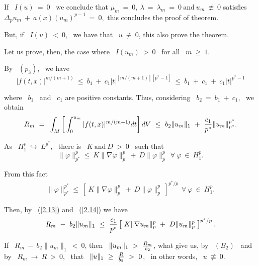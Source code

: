 \documentclass[12pt]{article}
\begin{document}
If \ $I(u) \ = \ 0$ \ we conclude that  $\mu_m \ = \ 0, \ \lambda \ = \ \lambda_m \ = \ 0 \ \mbox{and} \ u_m \ \not\equiv \ 0$ 
 satisfies 
$\Delta_pu_m \ + \ a(x)(u_m)^{p-1} \ = \ 0,$
  this concludes the proof of theorem.

But, if \ $I(u) \ < \ 0$, \ we have that \ $u \ \not\equiv \ 0$, this also prove the theorem.
{\vspace{0.2cm}}

Let us prove, then, the case where \ $I(u_m) \ > \ 0$ \ for all \ $m \ \geq \ 1$.

By \ $(p_3)$, \ we have
\vspace{-0.5mm}
$$|f(t,x)|^{m/(m+1)} \ \leq \ b_1 \ + \ c_1 |t|^{[m/(m+1)][p^{\ast}-1]} \ \leq \ b_1 \ + \ c_1 \ + \ c_1|t|^{p^{\ast}-1}$$

\noindent  where \ $b_1$ \ and \ $c_1$ are  positive constants. Thus, considering \ $b_2 \ = \ b_1 \ + \ c_1$, \ we obtain
\vspace{-0.5mm}
\begin{eqnarray}
\label{2.13}
R_m \ = \ {\displaystyle}\int_M{\left[{\displaystyle}\int_0^{u_m}{|f(t,x)|^{m/(m+1)}dt}\right]dV} \ \leq \ b_2\|u_m\|_1 \ +
 \ {\displaystyle}\frac{c_1}{p^{\ast}}\|u_m\|^{p^{\ast}}_{p^{\ast}}. 
\end{eqnarray}

As \ $H^p_1 \ \hookrightarrow \ L^{p^{\ast}}$, \ there is \ $K \ \mbox{and} \ D \ > \ 0$ \ such that 
\vspace{-0.5mm}
$$\|\varphi \|^p_{p^{\ast}} \leq \ K\|\nabla \varphi \|^p_p \ + \ D\|\varphi \|^p_p \ \ \forall \ \varphi \ \in \ H^p_1.$$

\noindent  From this fact
\vspace{-0.5mm}
\begin{eqnarray}
\label{2.14}
\|\varphi \|^{p^{\ast}}_{p^{\ast}} \leq \ \left[\ K\|\nabla \varphi \|^p_p \ + 
\ D\|\varphi \|^p_p \ \right]^{p^{\ast}/p} \ \  \forall \ \varphi \ \in \ H^p_1. 
\end{eqnarray}

Then, by \ (\ref{2.13}) and \ (\ref{2.14}) we have
\vspace{-0.5mm}
\begin{eqnarray}
\label{2.15}
R_m \ - \ b_2\|u_m\|_1 \ \leq \ {\displaystyle}\frac{c_1}{p^{\ast}}\left[\ K\|\nabla u_m \|^p_p \ + \ D\|u_m \|^p_p \ \right]^{p^{\ast}/p}. 
\end{eqnarray}

If \ $R_m \ - \ b_2\|u_m\|_1 \ < \ 0$, then \ $\|u_m\|_1 \ > \ {\displaystyle}\frac{R_m}{b_2}$, what give us, by \ $(B_2)$ \ and by
 \ $R_m \ \rightarrow \ R \ > \ 0$, \ that \ $\|u\|_1 \ \geq 
\ {\displaystyle}\frac{R}{b_2} \ > \ 0$, \ in other words, \ $u \ \not\equiv \ 0$.
{\vspace{0.2cm}}
\end{document}
